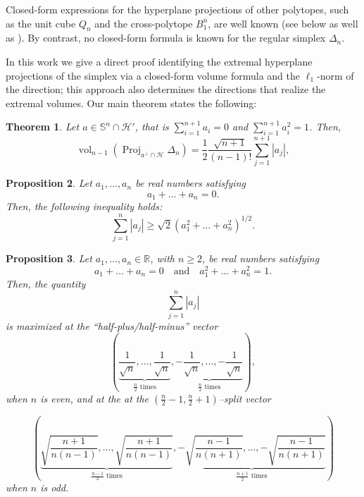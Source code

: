 \documentclass[10pt]{amsart}
\newcommand{\gr}{\geqslant}
\newcommand{\1}{\textbf{1}}
\numberwithin{equation}{section} %
\newtheorem{theorem}{Theorem}[section] %
\newtheorem{proposition}[theorem]{Proposition}
\theoremstyle{remark}
\theoremstyle{definition}
\begin{document}
Closed-form expressions for the hyperplane projections of other polytopes, such as the unit cube \(Q_n\) and the cross-polytope $B_1^n$, are well known (see below as well as \cite{nayar2023extremal}). By contrast, no closed-form formula is known for the regular simplex $\Delta_n$.

In this work we give a direct proof identifying the extremal hyperplane projections of the simplex via a closed-form volume formula and the $\ell_1$-norm of the  direction; this approach also determines the directions that realize the extremal volumes.  Our main theorem states the following:
\begin{theorem}\label{main thm}
Let $a\in \mathbb{S}^{n}\cap \mathcal{H}'$, that is $\sum_{i=1}^{n+1}a_i=0$ and $\sum_{i=1}^{n+1}a_i^2=1$. Then,
\begin{equation}\label{formula proj simp}
    \operatorname{vol}_{n-1}\left(\operatorname{Proj}_{a^{\perp}\cap\mathcal{H}}\Delta_n \right)=\frac{1}{2}\frac{\sqrt{n+1}}{(n-1)!}\sum_{j=1}^{n+1} \left|a_j\right|,
\end{equation}
\end{theorem}


\begin{proposition}\label{sum min}
Let $a_1, \ldots, a_{n}$ be real numbers satisfying
\[
a_1 + \ldots + a_{n} = 0.
\]
Then, the following inequality holds:
\[
\sum_{j=1}^{n} |a_j| \geq \sqrt{2} \left( a_1^2 + \ldots + a_{n}^2 \right)^{1/2}.
\]
\end{proposition}
\begin{proposition}\label{sum max}
Let $a_1, \ldots, a_{n} \in \mathbb{R}$, with $n \gr 2$, be real numbers satisfying
\[
a_1 + \ldots + a_{n} = 0 \quad \text{and} \quad a_1^2 + \ldots + a_{n}^2 = 1.
\]
Then, the quantity
\[
\sum_{j=1}^{n} |a_j|
\]
is maximized at the “half-plus/half-minus” vector
\[
\left( \underbrace{\frac{1}{\sqrt{n}}, \ldots, \frac{1}{\sqrt{n}}}_{\frac{n}{2} \text{ times}}, \underbrace{-\frac{1}{\sqrt{n}}, \ldots, -\frac{1}{\sqrt{n}}}_{\frac{n}{2} \text{ times}} \right),
\]
when $n$ is even, and at the at the $(\tfrac{n}{2}-1, \tfrac{n}{2}+1)$–split vector

$$\left(\underbrace{\sqrt{\frac{n+1}{n(n-1)}}, \ldots, \sqrt{\frac{n+1}{n(n-1)}}}_{\frac{n-1}{2} \text{  times}}, \underbrace{-\sqrt{\frac{n-1}{n(n+1)}}, \ldots, -\sqrt{\frac{n-1}{n(n+1)}}}_{\frac{n+1}{2} \text{ times}}\right)$$
when $n$ is odd.
\end{proposition}
\end{document}
